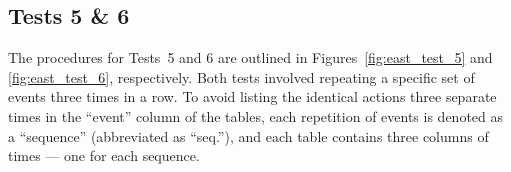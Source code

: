 \subsection{Tests 5 \& 6}
The procedures for Tests~5 and 6 are outlined in Figures~\ref{fig:east_test_5} and \ref{fig:east_test_6}, respectively. Both tests involved repeating a specific set of events three times in a row. To avoid listing the identical actions three separate times in the ``event'' column of the tables, each repetition of events is denoted as a ``sequence'' (abbreviated as ``seq.''), and each table contains three columns of times --- one for each sequence.
\\

